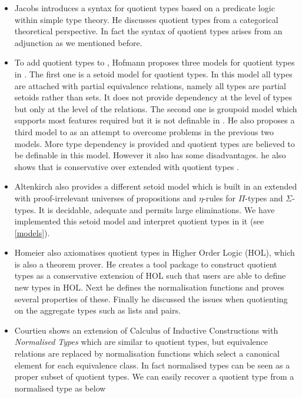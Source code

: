 \begin{itemize}
\item Jacobs \cite{Jacobs94quotientsin} introduces a syntax for quotient types based on a predicate logic
within simple type theory. He discusses quotient types from a categorical theoretical perspective. In fact the syntax of quotient types arises from an adjunction as we mentioned before.

\item To add quotient types to \mltt, Hofmann proposes three models for
quotient types in \cite{hof:phd}. The first one is a setoid model for
quotient types. In this model all types are attached with partial
equivalence relations, namely all types are partial setoids rather than
sets. It does not provide dependency at the level of types but only at the level of the relations. 
The second one is groupoid model which supports most features required 
but it is not definable in \itt. 
He also proposes a third model to as an attempt to overcome problems in the previous two models. More type dependency is provided and quotient types are believed to be definable in this model.
However it also has some disadvantages. 
he also shows that \ett is conservative over \itt extended with quotient types \cite{hof:95:con}.


\item Altenkirch \cite{alti:lics99} also provides a different setoid model which is built in an \itt
extended with proof-irrelevant universes of propositions and $\eta$-rules for $\Pi$-types and $\Sigma$-types. It is decidable, adequate and permits large eliminations. We have implemented this setoid model and interpret quotient types in it (see \autoref{models}).

\item Homeier \cite{hom} also axiomatises quotient types in Higher Order Logic
(HOL), which is also a theorem prover. He creates a tool package to
construct quotient types as a conservative extension of HOL such that
users are able to define new types in HOL. Next he defines the
normalisation functions and proves several properties of
these. Finally he discussed the issues when quotienting on the
aggregate types such as lists and pairs.


\item Courtieu \cite{cou:01} shows an extension of Calculus of Inductive Constructions
with \emph{Normalised Types} which are similar to quotient types, but equivalence relations are replaced by normalisation functions which select a canonical element for each equivalence class. 
In fact normalised types can be seen as a proper subset of quotient types. We can easily recover a quotient type from a normalised type as below


\end{itemize}
